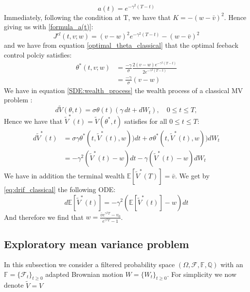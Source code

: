 \documentclass[oneside, a4paper, onecolumn, 11pt]{article}
\begin{document}
\begin{equation}
    a(t) = e^{-\gamma^2(T-t)}\label{formula_a(t)}
\end{equation}
Immediately, following the condition at T, we have that $K = -(w- \bar{v})^2$. 
Hence giving us with \eqref{formula_a(t)}:
\begin{equation}
    J^{cl}(t,v;w)  =  (v-w)^2 e^{-\gamma^2 (T-t)} - (w - \bar{v})^2 
\end{equation}
and we have from equation \eqref{optimal_theta_classical} that the optimal feeback control polciy satisfies: 
\begin{align*}
    \theta^*(t,v;w) &= \frac{-\gamma}{\sigma}\frac{2(v-w)e^{-\gamma^2 (T-t)}}{2e^{-\gamma^2 (T-t)}} \\
             &= \frac{-\gamma}{\sigma}(v-w)
\end{align*}
We have in equation \eqref{SDE:wealth_process} the wealth process of a classical MV problem :
\begin{equation*}
d\tilde{V}(\theta,t) = \sigma \theta(t) (\gamma \, dt + dW_t), \quad 0 \leq t \leq T, 
\end{equation*}
Hence we have that $\tilde{V}^*(t)= \tilde{V}(\theta^*,t)$ satisfies for all $0\leq t \leq T$: 
\begin{align} 
        d\tilde{V}^*(t) &= \sigma \gamma \theta^*(t,\tilde{V}^*(t),w)) dt + \sigma \theta^*(t,\tilde{V}^*(t),w)) dW_t \\
                &= -\gamma^2( \tilde{V}^*(t) -w)dt -\gamma(\tilde{V}^*(t) - w)dW_t \label{eq:drif_classical}
\end{align}
We have in addition the terminal wealth $\mathbb{E}[\tilde{V}^*(T)]=\bar{v}$. We get by \eqref{eq:drif_classical} the following ODE: 
\begin{equation}    
d\mathbb{E}\left[\tilde{V}^*(t)\right] = -\gamma^2(\mathbb{E}\left[\tilde{V}^*(t)\right] - w)dt \label{ODE:expected_wealth}
\end{equation}
And therefore we find that $w= \frac{\bar{v}e^{\gamma^2T} - v_0}{ e^{\gamma^2T} -1 }$. 

\subsection{Exploratory mean variance problem}
In this subsection we consider a filtered probability space $(\Omega, \mathcal{F}, \mathbb{F}, \mathbb{Q})$ with an $\mathbb{F}= \{\mathcal{F}_t\}_{t\geq 0}$ adapted Brownian motion $W=\{W_t\}_{t\geq 0}$. For simplicity we now denote $\tilde{V}= V$
\end{document}
